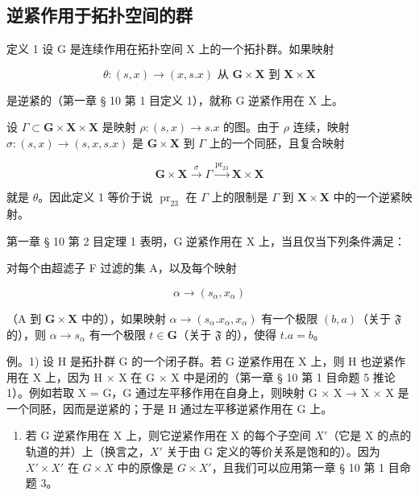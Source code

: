 \subsection{逆紧作用于拓扑空间的群}

定义 1 设 G 是连续作用在拓扑空间 X 上的一个拓扑群。如果映射

\[
\theta : (s, x) \rightarrow (x, s. x) \text{ 从 } \mathbf{G} \times \mathbf{X} \text{ 到 } \mathbf{X} \times \mathbf{X}
\]

是逆紧的（第一章 § 10 第 1 目定义 1），就称 G 逆紧作用在 X 上。

设 \(\Gamma \subset \mathbf{G} \times \mathbf{X} \times \mathbf{X}\) 是映射 \(\rho: (s, x) \to s.x\) 的图。由于 \(\rho\) 连续，映射 \(\sigma: (s, x) \to (s, x, s.x)\) 是 \(\mathbf{G} \times \mathbf{X}\) 到 \(\Gamma\) 上的一个同胚，且复合映射

\[
\mathbf {G} \times \mathbf {X} \xrightarrow {\sigma} \Gamma \xrightarrow {\mathrm{pr} _ {2 3}} \mathbf {X} \times \mathbf {X}
\]

就是 \(\theta\)。因此定义 1 等价于说 \(\operatorname{pr}_{23}\) 在 \(\Gamma\) 上的限制是 \(\Gamma\) 到 \(\mathbf{X} \times \mathbf{X}\) 中的一个逆紧映射。

第一章 § 10 第 2 目定理 1 表明，G 逆紧作用在 X 上，当且仅当下列条件满足：

对每个由超滤子 F 过滤的集 A，以及每个映射

\[
\alpha \rightarrow (s _ {\alpha}, x _ {\alpha})
\]

（A 到 \(\mathbf{G} \times \mathbf{X}\) 中的），如果映射 \(\alpha \to (s_{\alpha}.x_{\alpha}, x_{\alpha})\) 有一个极限 \((b, a)\)（关于 \(\mathfrak{F}\) 的），则 \(\alpha \to s_{\alpha}\) 有一个极限 \(t \in \mathbf{G}\)（关于 \(\mathfrak{F}\) 的），使得 \(t.a = b\)。

例。1) 设 H 是拓扑群 G 的一个闭子群。若 G 逆紧作用在 X 上，则 H 也逆紧作用在 X 上，因为 H × X 在 G × X 中是闭的（第一章 § 10 第 1 目命题 5 推论 1）。例如若取 X = G，G 通过左平移作用在自身上，则映射 G × X → X × X 是一个同胚，因而是逆紧的；于是 H 通过左平移逆紧作用在 G 上。

\begin{enumerate}
\def\labelenumi{\arabic{enumi})}
\setcounter{enumi}{1}
\tightlist
\item
  若 G 逆紧作用在 X 上，则它逆紧作用在 X 的每个子空间 \(X'\)（它是 X 的点的轨道的并）上（换言之，\(X'\) 关于由 G 定义的等价关系是饱和的）。因为 \(X' \times X'\) 在 \(G \times X\) 中的原像是 \(G \times X'\)，且我们可以应用第一章 § 10 第 1 目命题 3。
\end{enumerate}


